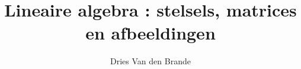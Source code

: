 \usepackage[dutch]{babel}
\usepackage{amsmath}
\usepackage{amssymb}
\newcommand*{\rom}[1]{\expandafter\@slowromancap\romannumeral #1@}
\newcommand{\RNum}[1]{\uppercase\expandafter{\romannumeral #1\relax}}


\title{Lineaire algebra \RNum{2} : stelsels, matrices en afbeeldingen}
\author{Dries Van den Brande}